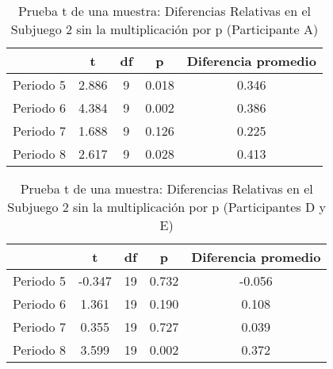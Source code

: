 \begin{table}[h]
\caption[Prueba t de una muestra: Diferencias Relativas en el Subjuego 2 sin la multioplicación por p (Participante A)]{Prueba t de una muestra: Diferencias Relativas en el Subjuego 2 sin la multiplicación por p (Participante A)}
\label{DN-S1}
\centering
\begin{tabular}{l | c c c | c}
\toprule
\textbf{} & \textbf{t} & \textbf{df} & \textbf{p} & \textbf{Diferencia promedio}\\
\midrule
Periodo 5 & 2.886 & 9 & 0.018 & 0.346\\
Periodo 6 & 4.384 & 9 & 0.002 & 0.386\\
Periodo 7 & 1.688 & 9 & 0.126 & 0.225\\
Periodo 8 & 2.617 & 9 & 0.028 & 0.413\\
\bottomrule
\end{tabular}
\end{table}











\begin{table}[h]
\caption[Prueba t de una muestra: Diferencias Relativas en el Subjuego 2 sin la multiplicación por p (Participantes D y E)]{Prueba t de una muestra: Diferencias Relativas en el Subjuego 2 sin la multiplicación por p (Participantes D y E)}
\label{DN-S1}
\centering
\begin{tabular}{l | c c c | c}
\toprule
\textbf{} & \textbf{t} & \textbf{df} & \textbf{p} & \textbf{Diferencia promedio}\\
\midrule
Periodo 5 & -0.347 & 19 & 0.732 & -0.056\\
Periodo 6 & 1.361 & 19 & 0.190 & 0.108\\
Periodo 7 & 0.355 & 19 & 0.727 & 0.039\\
Periodo 8 & 3.599 & 19 & 0.002 & 0.372\\
\bottomrule
\end{tabular}
\end{table}
